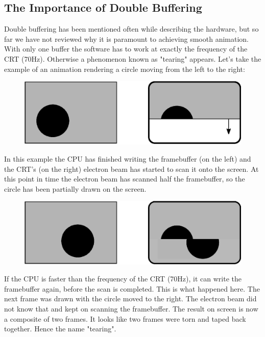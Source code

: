 \documentclass[book.tex]{subfiles}
\begin{document}
\subsection{The Importance of Double Buffering}
Double buffering has been mentioned often while describing the hardware, but so far we have not reviewed why it is paramount to achieving smooth animation. With only one buffer the software has to work at exactly the frequency of the CRT (70Hz). Otherwise a phenomenon known as "tearing" appears. Let's take the example of an animation rendering a circle moving from the left to the right:
\par
\begin{figure}[H]
\centering
\includegraphics[width=\textwidth]{imgs/drawings/doublebuffer_before.eps}
\end{figure}
\par
In this example the CPU has finished writing the framebuffer (on the left) and the CRT's (on the right) electron beam has started to scan it onto the screen. At this point in time the electron beam has scanned half the framebuffer, so the circle has been partially drawn on the screen.
\par
\begin{figure}[H]
\centering
\includegraphics[width=\textwidth]{imgs/drawings/doublebuffer_after.eps}
\end{figure}
\par
If the CPU is faster than the frequency of the CRT (70Hz), it can write the framebuffer again, before the scan is completed. This is what happened here. The next frame was drawn with the circle moved to the right. The electron beam did not know that and kept on scanning the framebuffer. The result on screen is now a composite of two frames. It looks like two frames were torn and taped back together. Hence the name "tearing".\\
\end{document}
